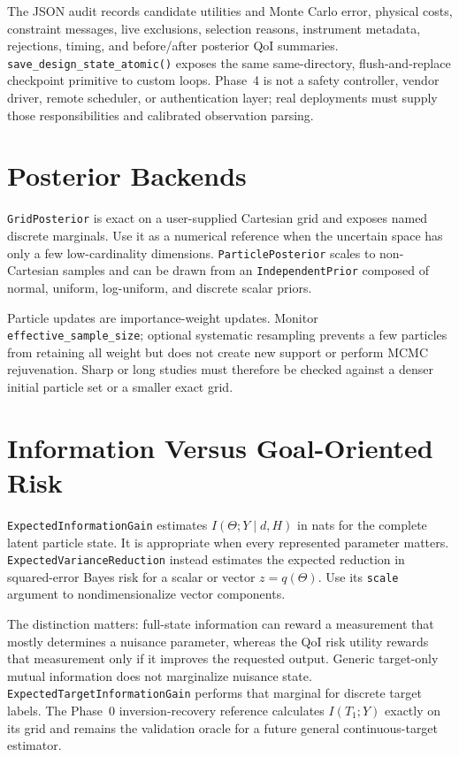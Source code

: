 \documentclass[11pt,oneside]{report}
\newcommand{\code}[1]{\texttt{#1}}
\begin{document}
The JSON audit records candidate utilities and Monte Carlo error, physical
costs, constraint messages, live exclusions, selection reasons, instrument
metadata, rejections, timing, and before/after posterior QoI summaries.
\code{save\_design\_state\_atomic()} exposes the same same-directory,
flush-and-replace checkpoint primitive to custom loops. Phase~4 is not a safety
controller, vendor driver, remote scheduler, or authentication layer; real
deployments must supply those responsibilities and calibrated observation
parsing.

\section{Posterior Backends}

\code{GridPosterior} is exact on a user-supplied Cartesian grid and exposes
named discrete marginals. Use it as a numerical reference when the uncertain
space has only a few low-cardinality dimensions. \code{ParticlePosterior}
scales to non-Cartesian samples and can be drawn from an
\code{IndependentPrior} composed of normal, uniform, log-uniform, and discrete
scalar priors.

Particle updates are importance-weight updates. Monitor
\code{effective\_sample\_size}; optional systematic resampling prevents a few
particles from retaining all weight but does not create new support or perform
MCMC rejuvenation. Sharp or long studies must therefore be checked against a
denser initial particle set or a smaller exact grid.

\section{Information Versus Goal-Oriented Risk}

\code{ExpectedInformationGain} estimates \(I(\Theta;Y\mid d,H)\) in nats for
the complete latent particle state. It is appropriate when every represented
parameter matters. \code{ExpectedVarianceReduction} instead estimates the
expected reduction in squared-error Bayes risk for a scalar or vector
\(z=q(\Theta)\). Use its \code{scale} argument to nondimensionalize vector
components.

The distinction matters: full-state information can reward a measurement that
mostly determines a nuisance parameter, whereas the QoI risk utility rewards
that measurement only if it improves the requested output. Generic target-only
mutual information does not marginalize nuisance state.
\code{ExpectedTargetInformationGain} performs that marginal for discrete
target labels. The Phase~0 inversion-recovery reference calculates
\(I(T_1;Y)\) exactly on its grid and remains the validation oracle for a future
general continuous-target estimator.
\end{document}
